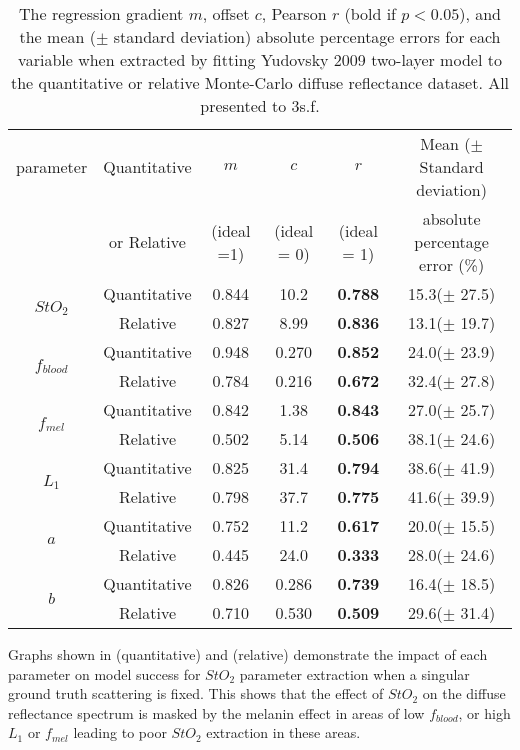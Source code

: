 \begin{table}[t]
    \centering
    \caption{The regression gradient $m$, offset $c$, Pearson $r$ (bold if $p<0.05$), and the mean ($\pm$ standard deviation) absolute percentage errors for each variable when extracted by fitting Yudovsky 2009 two-layer model to the quantitative or relative Monte-Carlo diffuse reflectance dataset. All presented to 3s.f.}
    \begin{tabular}{|c|c|cccc|}
        \hline
        parameter & Quantitative & $m$ & $c$ & $r$ & Mean ($\pm$ Standard deviation) \\
        & or Relative & (ideal =1) & (ideal = 0) & (ideal = 1) & absolute percentage error (\%)\\
        \hline
        \multirow{2}{*}{$StO_2$} & Quantitative & 0.844 & 10.2 & \textbf{0.788} & 15.3($\pm$ 27.5) \\
        & Relative & 0.827 & 8.99 & \textbf{0.836} & 13.1($\pm$ 19.7) \\
        \hline
        \multirow{2}{*}{$f_{blood}$} & Quantitative & 0.948 & 0.270 & \textbf{0.852} & 24.0($\pm$ 23.9) \\
        & Relative & 0.784 & 0.216 & \textbf{0.672} & 32.4($\pm$ 27.8) \\
        \hline
        \multirow{2}{*}{$f_{mel}$} & Quantitative & 0.842 & 1.38 & \textbf{0.843} & 27.0($\pm$ 25.7) \\
        & Relative & 0.502 & 5.14 & \textbf{0.506} & 38.1($\pm$ 24.6) \\
        \hline
        \multirow{2}{*}{$L_1$} & Quantitative & 0.825 & 31.4 & \textbf{0.794} & 38.6($\pm$ 41.9) \\
         & Relative & 0.798 & 37.7 & \textbf{0.775} & 41.6($\pm$ 39.9) \\
        \hline
        \multirow{2}{*}{$a$} & Quantitative & 0.752 & 11.2 & \textbf{0.617} & 20.0($\pm$ 15.5) \\
        & Relative & 0.445 & 24.0 & \textbf{0.333} & 28.0($\pm$ 24.6) \\
        \hline
        \multirow{2}{*}{$b$} & Quantitative & 0.826 & 0.286 & \textbf{0.739} & 16.4($\pm$ 18.5) \\
        & Relative & 0.710 & 0.530 & \textbf{0.509} & 29.6($\pm$ 31.4) \\
        \hline
    \end{tabular}
    \label{tb:doubleparamtrends}
\end{table}
Graphs shown in  (quantitative) and  (relative) demonstrate the impact of each parameter on model success for $StO_2$ parameter extraction when a singular ground truth scattering is fixed. This shows that the effect of $StO_2$ on the diffuse reflectance spectrum is masked by the melanin effect in areas of low $f_{blood}$, or high $L_1$ or $f_{mel}$ leading to poor $StO_2$ extraction in these areas. 
\FloatBarrier

